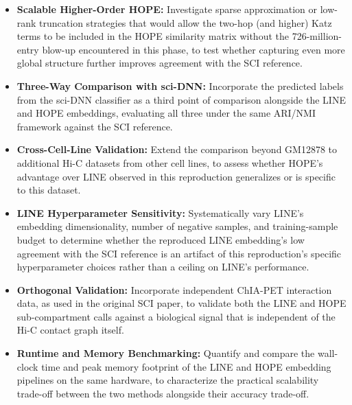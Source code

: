 \documentclass[12pt]{article}
\begin{document}
\begin{itemize}
    \item \textbf{Scalable Higher-Order HOPE:} Investigate sparse approximation or low-rank
    truncation strategies that would allow the two-hop (and higher) Katz terms to be included in
    the HOPE similarity matrix without the 726-million-entry blow-up encountered in this phase,
    to test whether capturing even more global structure further improves agreement with the
    SCI reference.

    \item \textbf{Three-Way Comparison with sci-DNN:} Incorporate the predicted labels from the
    sci-DNN classifier as a third point of comparison alongside the LINE and HOPE embeddings,
    evaluating all three under the same ARI/NMI framework against the SCI reference.

    \item \textbf{Cross-Cell-Line Validation:} Extend the comparison beyond GM12878 to additional
    Hi-C datasets from other cell lines, to assess whether HOPE's advantage over LINE observed in
    this reproduction generalizes or is specific to this dataset.

    \item \textbf{LINE Hyperparameter Sensitivity:} Systematically vary LINE's embedding
    dimensionality, number of negative samples, and training-sample budget to determine whether
    the reproduced LINE embedding's low agreement with the SCI reference is an artifact of this
    reproduction's specific hyperparameter choices rather than a ceiling on LINE's performance.

    \item \textbf{Orthogonal Validation:} Incorporate independent ChIA-PET interaction data, as
    used in the original SCI paper, to validate both the LINE and HOPE sub-compartment calls
    against a biological signal that is independent of the Hi-C contact graph itself.

    \item \textbf{Runtime and Memory Benchmarking:} Quantify and compare the wall-clock time and
    peak memory footprint of the LINE and HOPE embedding pipelines on the same hardware, to
    characterize the practical scalability trade-off between the two methods alongside their
    accuracy trade-off.
\end{itemize}


\end{document}
